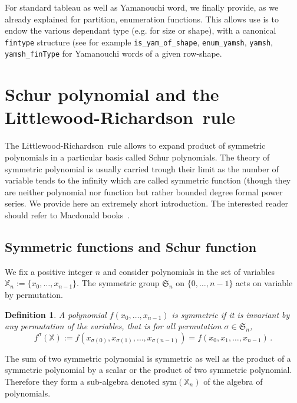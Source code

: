 \documentclass[12pt,a4paper]{article}
\newcommand{\LR}{Littlewood-Richardson\ }
\newcommand{\SG}{{\mathfrak S}}
\newcommand{\sym}{\mathrm{sym}}
\newcommand{\alphX}{{\mathbb X}}
\newtheorem{DEFN}{Definition}
\begin{document}
For standard tableau as well as Yamanouchi word, we finally provide, as we
already explained for partition, enumeration functions. This allows use is to
endow the various dependant type (e.g. for size or shape), with a canonical
\lstinline{fintype} structure (see for example \lstinline{is_yam_of_shape},
\lstinline{enum_yamsh}, \lstinline{yamsh}, \lstinline{yamsh_finType} for
Yamanouchi words of a given row-shape.
\section{Schur polynomial and the \LR rule}

The \LR rule allows to expand product of symmetric polynomials in a particular
basis called Schur polynomials. The theory of symmetric polynomial is usually
carried trough their limit as the number of variable tends to the infinity
which are called symmetric function (though they are neither polynomial nor
function but rather bounded degree formal power series. We provide here an
extremely short introduction. The interested reader should refer to Macdonald
books~\cite{Macddo}.

\subsection{Symmetric functions and Schur function}

We fix a positive integer $n$ and consider polynomials in the set of variables
$\alphX_n:=\{x_0,\dots,x_{n-1}\}$. The symmetric group $\SG_n$ on
$\{0,\dots,n-1\}$ acts on variable by permutation.
\begin{DEFN}
 A polynomial $f(x_0,\dots,x_{n-1})$ is symmetric if it is invariant by any
 permutation of the variables, that is for all permutation $\sigma\in\SG_n$,
 \begin{equation}
   f^\sigma(\alphX) := f(x_{\sigma(0)}, x_{\sigma(1)}, \dots, x_{\sigma(n-1)}) = 
   f(x_{0}, x_{1}, \dots, x_{n-1})\,.
 \end{equation}
\end{DEFN}
 The sum of two symmetric polynomial is symmetric as well as the
product of a symmetric polynomial by a scalar or the product of two symmetric
polynomial. Therefore they form a sub-algebra denoted $\sym(\alphX_n)$ of the
algebra of polynomials. 
\end{document}
